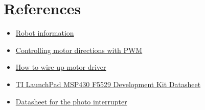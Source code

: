 \documentclass{article}
\begin{document}
\section{References}
\begin{itemize}
\item \href{http://fweb.wallawalla.edu/class-wiki/index.php/Assembly_Language_Programming#2015_Robot_Information}{Robot information}
\item \href{https://www.bananarobotics.com/shop/How-to-use-the-L298N-Dual-H-Bridge-Motor-Driver}{Controlling motor directions with PWM}
\item \href{http://www.instructables.com/id/Arduino-Modules-L298N-Dual-H-Bridge-Motor-Controll/?ALLSTEPS}{How to wire up motor driver}
\item \href{http://www.ti.com.cn/cn/lit/ug/slau533c/slau533c.pdf}{TI LaunchPad MSP430 F5529 Development Kit Datasheet}
\item \href{http://www.hyzt.com/manager/upimg/hy301\%E2\%80\%9407A.pdf}{Datasheet for the photo interrupter}
\end{itemize}
\end{document}
